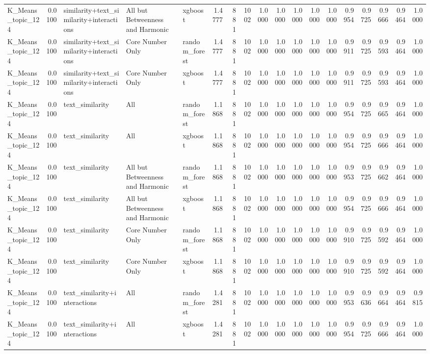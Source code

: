 \begin{tabular}{lrlllrrrrrrrrrrrrr}
K_Means_topic_124 & 0.0100 & similarity+text_similarity+interactions & All but Betweenness and Harmonic & xgboost & 1.4777 & 881 & 1002 & 1.0000 & 1.0000 & 1.0000 & 1.0000 & 1.0000 & 0.9954 & 0.9725 & 0.9666 & 0.9464 & 1.0000 \\
K_Means_topic_124 & 0.0100 & similarity+text_similarity+interactions & Core Number Only & random_forest & 1.4777 & 881 & 1002 & 1.0000 & 1.0000 & 1.0000 & 1.0000 & 1.0000 & 0.9911 & 0.9725 & 0.9593 & 0.9464 & 1.0000 \\
K_Means_topic_124 & 0.0100 & similarity+text_similarity+interactions & Core Number Only & xgboost & 1.4777 & 881 & 1002 & 1.0000 & 1.0000 & 1.0000 & 1.0000 & 1.0000 & 0.9911 & 0.9725 & 0.9593 & 0.9464 & 1.0000 \\
K_Means_topic_124 & 0.0100 & text_similarity & All & random_forest & 1.1868 & 881 & 1002 & 1.0000 & 1.0000 & 1.0000 & 1.0000 & 1.0000 & 0.9954 & 0.9725 & 0.9665 & 0.9464 & 1.0000 \\
K_Means_topic_124 & 0.0100 & text_similarity & All & xgboost & 1.1868 & 881 & 1002 & 1.0000 & 1.0000 & 1.0000 & 1.0000 & 1.0000 & 0.9954 & 0.9725 & 0.9666 & 0.9464 & 1.0000 \\
K_Means_topic_124 & 0.0100 & text_similarity & All but Betweenness and Harmonic & random_forest & 1.1868 & 881 & 1002 & 1.0000 & 1.0000 & 1.0000 & 1.0000 & 1.0000 & 0.9953 & 0.9725 & 0.9662 & 0.9464 & 1.0000 \\
K_Means_topic_124 & 0.0100 & text_similarity & All but Betweenness and Harmonic & xgboost & 1.1868 & 881 & 1002 & 1.0000 & 1.0000 & 1.0000 & 1.0000 & 1.0000 & 0.9954 & 0.9725 & 0.9666 & 0.9464 & 1.0000 \\
K_Means_topic_124 & 0.0100 & text_similarity & Core Number Only & random_forest & 1.1868 & 881 & 1002 & 1.0000 & 1.0000 & 1.0000 & 1.0000 & 1.0000 & 0.9910 & 0.9725 & 0.9592 & 0.9464 & 1.0000 \\
K_Means_topic_124 & 0.0100 & text_similarity & Core Number Only & xgboost & 1.1868 & 881 & 1002 & 1.0000 & 1.0000 & 1.0000 & 1.0000 & 1.0000 & 0.9910 & 0.9725 & 0.9592 & 0.9464 & 1.0000 \\
K_Means_topic_124 & 0.0100 & text_similarity+interactions & All & random_forest & 1.4281 & 881 & 1002 & 1.0000 & 1.0000 & 1.0000 & 1.0000 & 1.0000 & 0.9953 & 0.9636 & 0.9664 & 0.9464 & 0.9815 \\
K_Means_topic_124 & 0.0100 & text_similarity+interactions & All & xgboost & 1.4281 & 881 & 1002 & 1.0000 & 1.0000 & 1.0000 & 1.0000 & 1.0000 & 0.9954 & 0.9725 & 0.9666 & 0.9464 & 1.0000 \\

\end{tabular}
